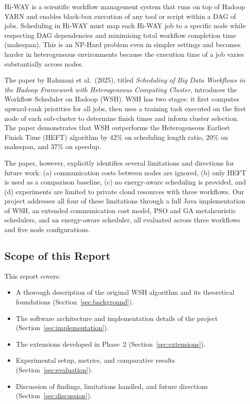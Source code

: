 \documentclass[12pt,a4paper]{article}
\begin{document}
Hi-WAY is a scientific workflow management system that runs on top of Hadoop YARN and enables black-box execution of any tool or script within a DAG of jobs. Scheduling in Hi-WAY must map each Hi-WAY job to a specific node while respecting DAG dependencies and minimising total workflow completion time (makespan). This is an NP-Hard problem even in simpler settings and becomes harder in heterogeneous environments because the execution time of a job varies substantially across nodes.

The paper by Rahmani et al.\ (2025), titled \textit{Scheduling of Big Data Workflows in the Hadoop Framework with Heterogeneous Computing Cluster}, introduces the Workflow Scheduler on Hadoop (WSH). WSH has two stages: it first computes upward-rank priorities for all jobs, then uses a training task executed on the first node of each sub-cluster to determine finish times and inform cluster selection. The paper demonstrates that WSH outperforms the Heterogeneous Earliest Finish Time (HEFT) algorithm by 42\% on scheduling length ratio, 20\% on makespan, and 37\% on speedup.

The paper, however, explicitly identifies several limitations and directions for future work: (a) communication costs between nodes are ignored, (b) only HEFT is used as a comparison baseline, (c) no energy-aware scheduling is provided, and (d) experiments are limited to private cloud resources with three workflows. Our project addresses all four of these limitations through a full Java implementation of WSH, an extended communication cost model, PSO and GA metaheuristic schedulers, and an energy-aware scheduler, all evaluated across three workflows and five node configurations.

\subsection{Scope of this Report}
This report covers:
\begin{itemize}[leftmargin=1.5cm]
    \item A thorough description of the original WSH algorithm and its theoretical foundations (Section~\ref{sec:background}).
    \item The software architecture and implementation details of the project (Section~\ref{sec:implementation}).
    \item The extensions developed in Phase~2 (Section~\ref{sec:extensions}).
    \item Experimental setup, metrics, and comparative results (Section~\ref{sec:evaluation}).
    \item Discussion of findings, limitations handled, and future directions (Section~\ref{sec:discussion}).
\end{itemize}
\end{document}
